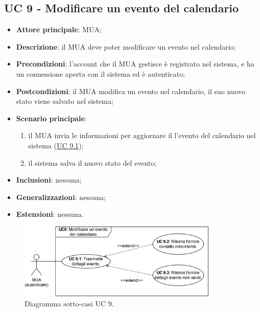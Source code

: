 \subsection{UC 9 - Modificare un evento del calendario} \label{sec:UC8}
    \begin{itemize}
        \item \textbf{Attore principale}: MUA;
        \item \textbf{Descrizione}: il MUA deve poter modificare un evento nel calendario;
        \item \textbf{Precondizioni}: l’account che il MUA gestisce è registrato nel sistema, e ha un connessione aperta con il sistema ed è autenticato;
        \item \textbf{Postcondizioni}: il MUA modifica un evento nel calendario, il suo nuovo stato viene salvato nel sistema;
        \item \textbf{Scenario principale}:
            \begin{enumerate}
                \item il MUA invia le informazioni per aggiornare il l'evento del calendario nel sistema (\hyperref[sec:UC9.1]{UC 9.1});
                \item il sistema salva il nuovo stato del evento;
            \end{enumerate}
        \item \textbf{Inclusioni}: nessuna;
        \item \textbf{Generalizzazioni}: nessuna;
        \item \textbf{Estensioni}: nessuna.
    \end{itemize}

\begin{figure}[h]
    \includegraphics[width=0.85\textwidth]{sections/uc_imgs/UC09.X.png}
    \centering
    \caption{Diagramma sotto-casi UC 9.}
\end{figure}

